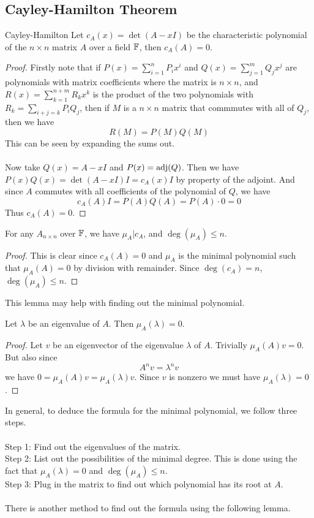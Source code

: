 \documentclass[a4paper]{article}
\begin{document}
\subsection{Cayley-Hamilton Theorem}
\begin{thm}{Cayley-Hamilton}{} Let $c_A(x)=\det(A-xI)$ be the characteristic polynomial of the $n\times n$ matrix $A$ over a field $\mathbb{F}$, then $c_A(A)=0$. \tcbline
\begin{proof} Firstly note that if $P(x)=\sum_{i=1}^nP_ix^i$ and $Q(x)=\sum_{j=1}^mQ_jx^j$ are polynomials with matrix coefficients where the matrix is $n\times n$, and $R(x)=\sum_{k=1}^{n+m}R_kx^k$ is the product of the two polynomials with $R_k=\sum_{i+j=k}P_iQ_j$, then if $M$ is a $n\times n$ matrix that commmutes with all of $Q_j$, then we have $$R(M)=P(M)Q(M)$$
This can be seen by expanding the sums out. \\~\\
Now take $Q(x)=A-xI$ and $P(x)=\operatorname{adj}(Q)$. Then we have $P(x)Q(x)=\det(A-xI)I=c_A(x)I$ by property of the adjoint. And since $A$ commutes with all coefficients of the polynomial of $Q$, we have $$c_A(A)I=P(A)Q(A)=P(A)\cdot 0=0$$ Thus $c_A(A)=0$. 
\end{proof}
\end{thm}

\begin{crl}{}{} For any $A_{n\times n}$ over $\mathbb{F}$, we have $\mu_A|c_A$, and $\deg(\mu_A)\leq n$. \tcbline
\begin{proof}
This is clear since $c_A(A)=0$ and $\mu_A$ is the minimal polynomial such that $\mu_A(A)=0$ by division with remainder. Since $\deg(c_A)=n$, $\deg(\mu_A)\leq n$. 
\end{proof}
\end{crl}

This lemma may help with finding out the minimal polynomial. 

\begin{lmm}{}{} Let $\lambda$ be an eigenvalue of $A$. Then $\mu_A(\lambda)=0$. \tcbline
\begin{proof}
Let $v$ be an eigenvector of the eigenvalue $\lambda$ of $A$. Trivially $\mu_A(A)v=0$. But also since $$A^nv=\lambda^nv$$ we have $0=\mu_A(A)v=\mu_A(\lambda)v$. Since $v$ is nonzero we must have $\mu_A(\lambda)=0$. 
\end{proof}
\end{lmm}

In general, to deduce the formula for the minimal polynomial, we follow three steps. \\~\\
Step 1: Find out the eigenvalues of the matrix. \\
Step 2: List out the possibilities of the minimal degree. This is done using the fact that $\mu_A(\lambda)=0$ and $\deg(\mu_A)\leq n$. \\
Step 3: Plug in the matrix to find out which polynomial has its root at $A$. \\~\\
There is another method to find out the formula using the following lemma. 
\end{document}
